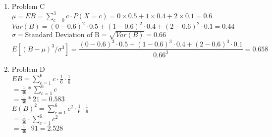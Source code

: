 \documentclass{amsart}
\begin{document}
\begin{enumerate}
\begin{enumerate}
$E(D_1)=3\cdot P(D_1=3)+2\cdot P(D_1=2)+1\cdot (D_1=1) = 3/4 + 6/8 + 3/8 = 15/8 = 1.875$\\\\
$Var(D_1)=E(D_1^2)-(ED_1)^2\\ = 3^2\cdot P(D_1=3)+2^2\cdot P(D_1=2)+1^2\cdot (D_1=1) - (15/8)^2$\\
$=9/4+12/8+3/8-225/16=144/64+96/64+24/64-225/64=39/64$\\
$Var(D_1)=39/64$\\

\item Covariance between the degrees of $v_1$ and $v_2$. \\
$E(D_2)=E(D_1)=1.875$ because ($P(N_3=1)=P(N_3=2)$)\\
$Cov(D_1,D_2)=E[(D_1-ED_1)(D_2-ED_2)]=(3-15/8)(1-15/8)\cdot 1/4+(2-15/8)(1-15/8)\cdot 1/8+(2-15/8)(2-15/8)\cdot2/8+(1-15/8)(2-15/8)\cdot 1/8+(1-15/8)(3-15/8)\cdot 2/8=-33/64$\\



\end{enumerate}

\item Problem C \\
$\mu = EB = \displaystyle \sum_{c=0}^3 c\cdot P(X=c) = 0\times0.5 + 1\times0.4 + 2\times0.1 = 0.6$\\
$Var(B) = (0 - 0.6)^2 \cdot 0.5 + (1-0.6)^2 \cdot0.4 + (2-0.6)^2 \cdot0.1 = 0.44$\\
$\sigma = \text{Standard Deviation of B} = \sqrt{Var(B)}= 0.66$\\
$E[(B-\mu)^3/\sigma^3]= \dfrac{(0-0.6)^3\cdot0.5+(1-0.6)^3\cdot0.4+(2-0.6)^3\cdot0.1}{0.66^3} = 0.658$\\




\item Problem D \\

$EB =\displaystyle \sum_{c=1}^{6} c \cdot \frac{1}{6} \cdot \frac{1}{6}$\\
$=\displaystyle \frac{1}{36}*\sum_{c=1}^{6} c $\\
 $   =\displaystyle \frac{1}{36} * 21 = 0.583 $\\
    
$E(B)^2 =\displaystyle \sum_{c=1}^{6} c^2 \cdot \frac{1}{6} \cdot \frac{1}{6} $\\
$=\displaystyle \frac{1}{36}\cdot\sum_{c=1}^{6} c^2$\\
$=\displaystyle \frac{1}{36} \cdot 91 = 2.528$\\

\end{enumerate}
\end{document}
